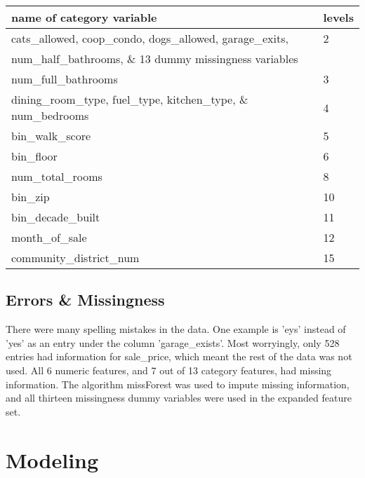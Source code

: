 \documentclass{article}
\begin{document}
\begin{table}[htb]
\begin{tabular}{|l|l|}
\hline
name of category variable                         & levels \\ \hline
cats\_allowed, coop\_condo, dogs\_allowed, garage\_exits,       & 2          \\
num\_half\_bathrooms, \& 13 dummy missingness variables                      &            \\ \hline
num\_full\_bathrooms                                            & 3          \\ \hline
dining\_room\_type, fuel\_type, kitchen\_type, \& num\_bedrooms & 4          \\ \hline
bin\_walk\_score                                                & 5          \\ \hline
bin\_floor                                                      & 6          \\ \hline
num\_total\_rooms                                               & 8          \\ \hline
bin\_zip                                                        & 10         \\ \hline
bin\_decade\_built                                              & 11         \\ \hline
month\_of\_sale                                                 & 12         \\ \hline
community\_district\_num                                        & 15         \\ \hline
\end{tabular}
\end{table}

\subsection{Errors \& Missingness}
There were many spelling mistakes in the data. One example is 'eys' instead of 'yes' as an entry under the column 'garage\_exists'. Most worryingly, only 528 entries had information for sale\_price, which meant the rest of the data was not used. All 6 numeric features, and 7 out of 13 category features, had missing information. The algorithm missForest was used to impute missing information, and all thirteen missingness dummy variables were used in the expanded feature set. 
\section{Modeling}
\end{document}
